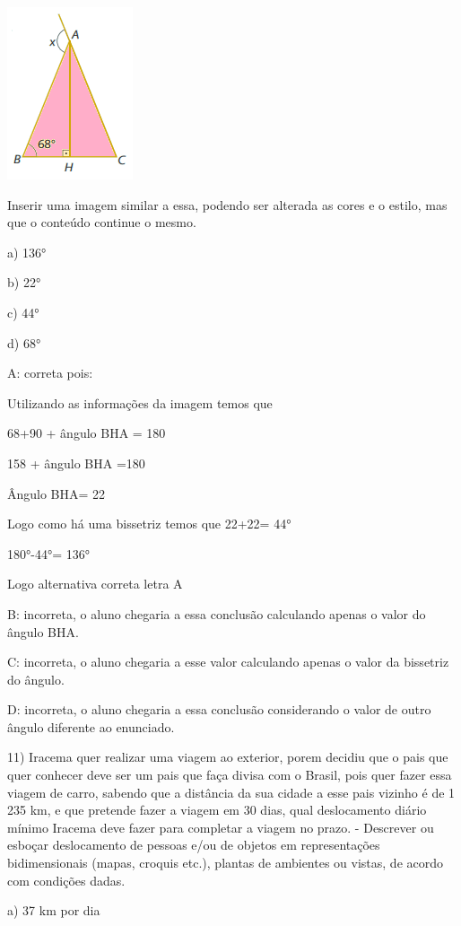 {\includegraphics[width=1.45833in,height=2in]{./imgSAEB_8_MAT/media/image58.png}

Inserir uma imagem similar a essa, podendo ser alterada as cores e o
estilo, mas que o conteúdo continue o mesmo.

a) 136°

b) 22°

c) 44°

d) 68°

A: correta pois:

Utilizando as informações da imagem temos que

68+90 + ângulo BHA = 180

158 + ângulo BHA =180

Ângulo BHA= 22

Logo como há uma bissetriz temos que 22+22= 44°

180°-44°= 136°

Logo alternativa correta letra A

B: incorreta, o aluno chegaria a essa conclusão calculando apenas o
valor do ângulo BHA.

C: incorreta, o aluno chegaria a esse valor calculando apenas o valor da
bissetriz do ângulo.

D: incorreta, o aluno chegaria a essa conclusão considerando o valor de
outro ângulo diferente ao enunciado.

11) Iracema quer realizar uma viagem ao exterior, porem decidiu que o
pais que quer conhecer deve ser um pais que faça divisa com o Brasil,
pois quer fazer essa viagem de carro, sabendo que a distância da sua
cidade a esse pais vizinho é de 1 235 km, e que pretende fazer a viagem
em 30 dias, qual deslocamento diário mínimo Iracema deve fazer para
completar a viagem no prazo. - Descrever ou esboçar deslocamento de
pessoas e/ou de objetos em representações bidimensionais (mapas, croquis
etc.), plantas de ambientes ou vistas, de acordo com condições dadas.

a) 37 km por dia

}
